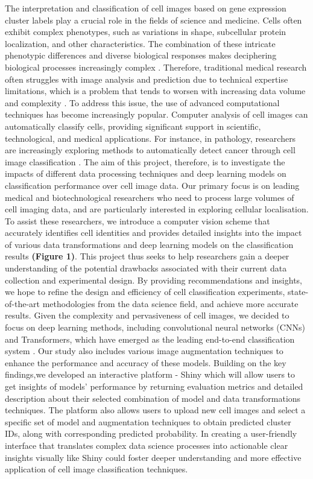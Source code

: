 \documentclass[letterpaper,9pt,twocolumn,twoside,]{pinp}
\begin{document}
The interpretation and classification of cell images based on gene
expression cluster labels play a crucial role in the fields of science
and medicine. Cells often exhibit complex phenotypes, such as variations
in shape, subcellular protein localization, and other characteristics.
The combination of these intricate phenotypic differences and diverse
biological responses makes deciphering biological processes increasingly
complex \citep{ShifatERabbi2019CellIC}. Therefore, traditional medical
research often struggles with image analysis and prediction due to
technical expertise limitations, which is a problem that tends to worsen
with increasing data volume and complexity \citep{panayides2020AI}. To
address this issue, the use of advanced computational techniques has
become increasingly popular. Computer analysis of cell images can
automatically classify cells, providing significant support in
scientific, technological, and medical applications. For instance, in
pathology, researchers are increasingly exploring methods to
automatically detect cancer through cell image classification
\citep{6fd805a257464dcc92460b6cf9dcee63}. The aim of this project,
therefore, is to investigate the impacts of different data processing
techniques and deep learning models on classification performance over
cell image data. Our primary focus is on leading medical and
biotechnological researchers who need to process large volumes of cell
imaging data, and are particularly interested in exploring cellular
localisation. To assist these researchers, we introduce a computer
vision scheme that accurately identifies cell identities and provides
detailed insights into the impact of various data transformations and
deep learning models on the classification results \textbf{(Figure 1)}.
This project thus seeks to help researchers gain a deeper understanding
of the potential drawbacks associated with their current data collection
and experimental design. By providing recommendations and insights, we
hope to refine the design and efficiency of cell classification
experiments, state-of-the-art methodologies from the data science field,
and achieve more accurate results. Given the complexity and
pervasiveness of cell images, we decided to focus on deep learning
methods, including convolutional neural networks (CNNs) and
Transformers, which have emerged as the leading end-to-end
classification system \citep{ShifatERabbi2019CellIC}. Our study also
includes various image augmentation techniques to enhance the
performance and accuracy of these models. Building on the key
findings,we developed an interactive platform - Shiny which will allow
users to get insights of models' performance by returning evaluation
metrics and detailed description about their selected combination of
model and data transformations techniques. The platform also allows
users to upload new cell images and select a specific set of model and
augmentation techniques to obtain predicted cluster IDs, along with
corresponding predicted probability. In creating a user-friendly
interface that translates complex data science processes into actionable
clear insights visually like Shiny could foster deeper understanding and
more effective application of cell image classification techniques.
\end{document}
